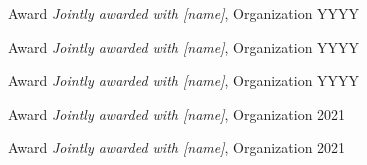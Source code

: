 
\begin{cvhonors}

    \cvhonor
    { Award} %
    { \textit{Jointly awarded with [name]}, Organization } %
    {} %
    {YYYY} %
 
     \cvhonor
    { Award} %
    { \textit{Jointly awarded with [name]}, Organization } %
    {} %
    {YYYY} %
    
    \cvhonor
    { Award} %
    { \textit{Jointly awarded with [name]}, Organization } %
    {} %
    {YYYY} %
    


\begin{cvhonors}

    \cvhonor
    { Award} %
    { \textit{Jointly awarded with [name]}, Organization } %
    {} %
    {2021} %

    \cvhonor
    { Award} %
    { \textit{Jointly awarded with [name]}, Organization } %
    {} %
    {2021} %
\end{cvhonors}

\begin{cvhonors}


\end{cvhonors}
\end{cvhonors}
